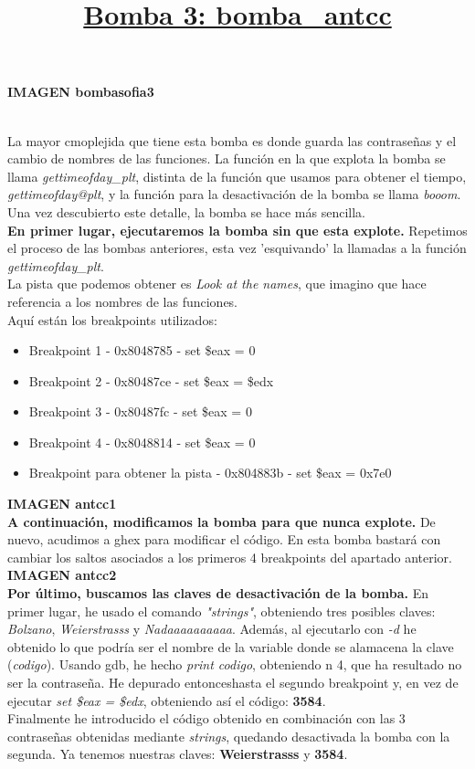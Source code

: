 \documentclass[11pt,a4paper]{article}
\begin{document}
\textbf{IMAGEN bombasofia3} \\

\title{\large{\textbf{\underline{Bomba 3: bomba\_antcc}}}} \\

La mayor cmoplejida que tiene esta bomba es donde guarda las contraseñas y el cambio de nombres de las funciones. La función en la que explota la bomba se llama \emph{gettimeofday\_plt}, distinta de la función que usamos para obtener el tiempo, \emph{gettimeofday@plt}, y la función para la desactivación de la bomba se llama \emph{booom}. Una vez descubierto este detalle, la bomba se hace más sencilla. \\

\textbf{En primer lugar, ejecutaremos la bomba sin que esta explote.} Repetimos el proceso de las bombas anteriores, esta vez 'esquivando' la llamadas a la función \emph{gettimeofday\_plt}. \\
La pista que podemos obtener es \emph{Look at the names}, que imagino que hace referencia a los nombres de las funciones. \\
Aquí están los breakpoints utilizados: \\

\begin{itemize}
	\item Breakpoint 1 - 0x8048785 - set \$eax = 0
	\item Breakpoint 2 - 0x80487ce - set \$eax = \$edx
	\item Breakpoint 3 - 0x80487fc - set \$eax = 0
	\item Breakpoint 4 - 0x8048814 - set \$eax = 0
	\item Breakpoint para obtener la pista - 0x804883b - set \$eax = 0x7e0
\end{itemize}

\textbf{IMAGEN antcc1} \\

\textbf{A continuación, modificamos la bomba para que nunca explote.} De nuevo, acudimos a ghex para modificar el código. En esta bomba bastará con cambiar los saltos asociados a los primeros 4 breakpoints del apartado anterior. \\

\textbf{IMAGEN antcc2} \\

\textbf{Por último, buscamos las claves de desactivación de la bomba.} En primer lugar, he usado el comando \emph{"strings"}, obteniendo tres posibles claves: \emph{Bolzano}, \emph{Weierstrasss} y \emph{Nadaaaaaaaaaa}. Además, al ejecutarlo con \emph{-d} he obtenido lo que podría ser el nombre de la variable donde se alamacena la clave (\emph{codigo}). 
Usando gdb, he hecho \emph{print codigo}, obteniendo n 4, que ha resultado no ser la contraseña. He depurado entonceshasta el segundo breakpoint y, en vez de ejecutar \emph{set \$eax = \$edx}, obteniendo así el código: \textbf{3584}. \\
Finalmente he introducido el código obtenido en combinación con las 3 contraseñas obtenidas mediante \emph{strings}, quedando desactivada la bomba con la segunda. Ya tenemos nuestras claves: \textbf{Weierstrasss} y \textbf{3584}. \\
\end{document}
